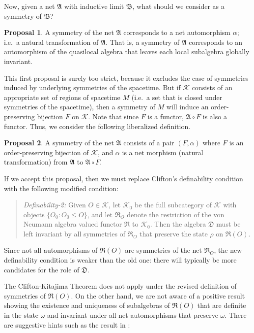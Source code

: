 \documentclass[12pt]{article}
\newcommand{\alg}[1]{\mathfrak{#1}}
\theoremstyle{definition}
\newtheorem{proposal}{Proposal}
\theoremstyle{definition}
\theoremstyle{remark}
\def\2#1{{\mathcal #1}}
\def\al#1{{\mathfrak #1}}
\def\a{\alpha} \def\b{\beta} \def\g{\gamma} \def\d{\delta}
\def\om{\omega} \def\Om{\Omega} \def\dd{\partial} \def\D{\Delta}
\begin{document}
Now, given a net $\alg{A}$ with inductive limit $\alg{B}$, what should we consider as
a symmetry of $\alg{B}$?

\begin{proposal} A symmetry of the net $\alg{A}$ corresponds to a net
  automorphism $\a$; i.e.\ a natural transformation of $\alg{A}$.
  That is, a symmetry of $\alg{A}$ corresponds to an automorphism of
  the quasilocal algebra that leaves each local subalgebra globally
  invariant.
\end{proposal}

This first proposal is surely too strict, because it excludes the case
of symmetries induced by underlying symmetries of the spacetime.  But
if $\2K$ consists of an appropriate set of regions of spacetime $M$
(i.e.\ a set that is closed under symmetries of the spacetime), then a
symmetry of $M$ will induce an order-preserving bijection $F$ on
$\2K$.  Note that since $F$ is a functor, $\alg{A}\circ F$ is also a
functor.  Thus, we consider the following liberalized definition.

\begin{proposal} A symmetry of the net $\alg{A}$ consists of a pair $(F,\a )$ where
  $F$ is an order-preserving bijection of $\2K$, and $\a$ is a net morphism (natural
  transformation) from $\alg{A}$ to $\alg{A}\circ F$.
\end{proposal}

If we accept this proposal, then we must replace Clifton's definability condition
with the following modified condition:

\begin{quote} \textit{Definability-2:} Given $O\in \2K$, let $\2K _0$
  be the full subcategory of $\2K$ with objects $\{ O_0:O_0\leq O \}$,
  and let $\alg{R}_{O}$ denote the restriction of the von Neumann
  algebra valued functor $\alg{R}$ to $\2K _0$.  Then the algebra
  $\alg{D}$ must be left invariant by all symmetries of $\alg{R}_O$
  that preserve the state $\rho$ on $\alg{R}(O)$.
\end{quote} Since not all automorphisms of $\alg{R}(O)$ are symmetries of the net
$\alg{R}_O$, the new definability condition is weaker than the old one: there will
typically be more candidates for the role of $\alg{D}$.   

The Clifton-Kitajima Theorem does not apply under the revised
definition of symmetries of $\al R(O)$.  On the other hand, we are not
aware of a positive result showing the existence and uniqueness of
subalgebras of $\al R(O)$ that are definite in the state $\om$ and
invariant under all net automorphisms that preserve $\om$.  There are
suggestive hints such as the result in \cite{split}:
\end{document}
